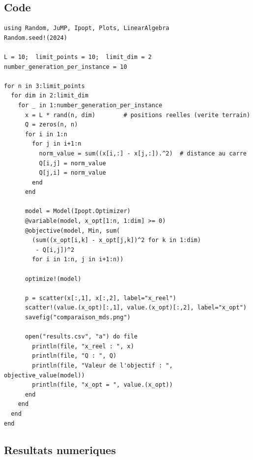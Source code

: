 \documentclass[12pt,a4paper]{article}
\begin{document}
\subsection{Code}

\begin{lstlisting}[caption={formulation\_1\_g2.jl}]
using Random, JuMP, Ipopt, Plots, LinearAlgebra
Random.seed!(2024)

L = 10;  limit_points = 10;  limit_dim = 2
number_generation_per_instance = 10

for n in 3:limit_points
  for dim in 2:limit_dim
    for _ in 1:number_generation_per_instance
      x = L * rand(n, dim)        # positions reelles (verite terrain)
      Q = zeros(n, n)
      for i in 1:n
        for j in i+1:n
          norm_value = sum((x[i,:] - x[j,:]).^2)  # distance au carre
          Q[i,j] = norm_value
          Q[j,i] = norm_value
        end
      end

      model = Model(Ipopt.Optimizer)
      @variable(model, x_opt[1:n, 1:dim] >= 0)
      @objective(model, Min, sum(
        (sum((x_opt[i,k] - x_opt[j,k])^2 for k in 1:dim)
         - Q[i,j])^2
        for i in 1:n, j in i+1:n))

      optimize!(model)

      p = scatter(x[:,1], x[:,2], label="x_reel")
      scatter!(value.(x_opt)[:,1], value.(x_opt)[:,2], label="x_opt")
      savefig("comparaison_mds.png")

      open("results.csv", "a") do file
        println(file, "x_reel : ", x)
        println(file, "Q : ", Q)
        println(file, "Valeur de l'objectif : ", objective_value(model))
        println(file, "x_opt = ", value.(x_opt))
      end
    end
  end
end
\end{lstlisting}

\subsection{Resultats numeriques}
\end{document}
